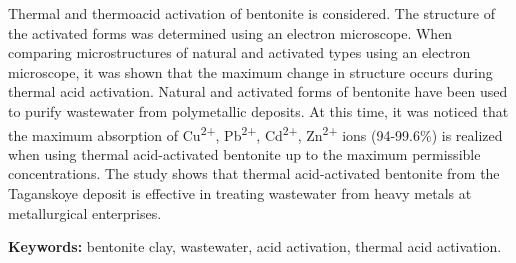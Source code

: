 Thermal and thermoacid activation of bentonite is considered. The
structure of the activated forms was determined using an electron
microscope. When comparing microstructures of natural and activated
types using an electron microscope, it was shown that the maximum change
in structure occurs during thermal acid activation. Natural and
activated forms of bentonite have been used to purify wastewater from
polymetallic deposits. At this time, it was noticed that the maximum
absorption of Cu\textsuperscript{2+}, Pb\textsuperscript{2+},
Cd\textsuperscript{2+}, Zn\textsuperscript{2+} ions (94-99.6\%) is
realized when using thermal acid-activated bentonite up to the maximum
permissible concentrations. The study shows that thermal acid-activated
bentonite from the Taganskoye deposit is effective in treating
wastewater from heavy metals at metallurgical enterprises.

{\bfseries Keywords:} bentonite clay, wastewater, acid activation, thermal
acid activation.

